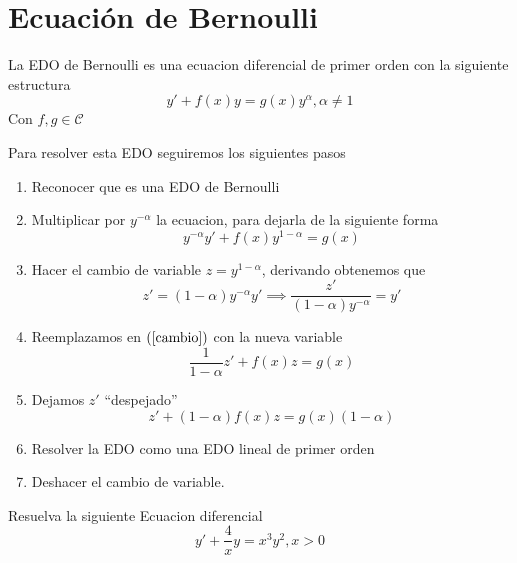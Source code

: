 \documentclass[a4paper,oneside,10.5pt]{article}
\begin{document}
\section*{Ecuaci\'on de Bernoulli}
La EDO de Bernoulli es una ecuacion diferencial de primer orden con la siguiente estructura
\begin{equation*}
  y' + f(x) y = g(x)y^{\alpha}, \alpha \neq 1
\end{equation*}
Con $f, g \in \mathcal{C}$

Para resolver esta EDO seguiremos los siguientes pasos
\begin{enumerate}
  \item Reconocer que es una EDO de Bernoulli
  \item Multiplicar por $y^{-\alpha}$ la ecuacion, para dejarla de la siguiente forma
        \begin{equation*}
          \label{cambio}
          y^{-\alpha}y' + f(x)y^{1 - \alpha} = g(x)
        \end{equation*}
  \item Hacer el cambio de variable $z = y^{1 - \alpha}$, derivando obtenemos que
        \begin{equation*}
          z' = (1 - \alpha)y^{-\alpha}y' \implies \frac{z'}{(1 - \alpha)y^{-\alpha}} = y'
        \end{equation*}
  \item Reemplazamos en $(\ref{cambio})$ con la nueva variable
        \begin{equation*}
          \frac{1}{1 - \alpha} z' + f(x)z = g(x)
        \end{equation*}
  \item Dejamos $z'$ ``despejado''
        \begin{equation*}
          z' + (1 - \alpha) f(x) z = g(x)(1 - \alpha)
        \end{equation*}
  \item Resolver la EDO como una EDO lineal de primer orden
  \item Deshacer el cambio de variable.
\end{enumerate}

\begin{ejemplo}
  Resuelva la siguiente Ecuacion diferencial
  \begin{equation*}
    y' + \frac{4}{x}y = x^{3}y^{2}, x > 0
  \end{equation*}
\end{ejemplo}
\end{document}
